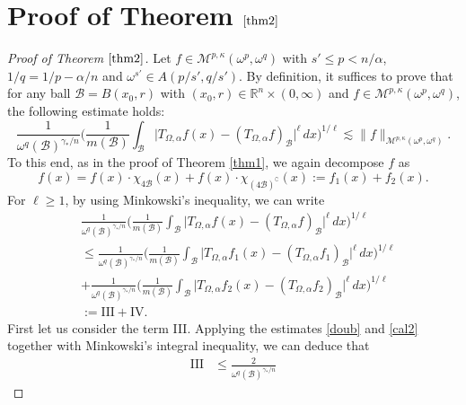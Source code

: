 \documentclass[preprint,10pt]{elsarticle}
\numberwithin{equation}{section}
\begin{document}
\section{Proof of Theorem $\ref{thm2}$}
\begin{proof}[Proof of Theorem $\ref{thm2}$]
Let $f\in\mathcal{M}^{p,\kappa}(\omega^p,\omega^q)$ with $s'\leq p<n/{\alpha}$, $1/q=1/p-{\alpha}/n$ and $\omega^{s'}\in A(p/{s'},q/{s'})$. By definition, it suffices to prove that for any ball $\mathcal{B}=B(x_0,r)$ with $(x_0,r)\in\mathbb R^n\times(0,\infty)$ and $f\in\mathcal{M}^{p,\kappa}(\omega^p,\omega^q)$, the following estimate holds:
\begin{equation}\label{mainwh}
\frac{1}{\omega^q(\mathcal{B})^{{\gamma_*}/n}}
\bigg(\frac{1}{m(\mathcal{B})}\int_{\mathcal{B}}\big|T_{\Omega,\alpha}f(x)-(T_{\Omega,\alpha}f)_{\mathcal{B}}\big|^{\ell}\,dx\bigg)^{1/{\ell}}
\lesssim\|f\|_{\mathcal{M}^{p,\kappa}(\omega^p,\omega^q)}.
\end{equation}
To this end, as in the proof of Theorem \ref{thm1}, we again decompose $f$ as
\begin{equation*}
f(x)=f(x)\cdot\chi_{4\mathcal{B}}(x)+f(x)\cdot\chi_{(4\mathcal{B})^{\complement}}(x):=f_1(x)+f_2(x).
\end{equation*}
For $\ell\geq1$, by using Minkowski's inequality, we can write
\begin{equation*}
\begin{split}
&\frac{1}{\omega^q(\mathcal{B})^{{\gamma_*}/n}}
\bigg(\frac{1}{m(\mathcal{B})}\int_{\mathcal{B}}\big|T_{\Omega,\alpha}f(x)-(T_{\Omega,\alpha}f)_{\mathcal{B}}\big|^{\ell}\,dx\bigg)^{1/{\ell}}\\
&\leq \frac{1}{\omega^q(\mathcal{B})^{{\gamma_*}/n}}
\bigg(\frac{1}{m(\mathcal{B})}\int_{\mathcal{B}}\big|T_{\Omega,\alpha}f_1(x)-(T_{\Omega,\alpha}f_1)_{\mathcal{B}}\big|^{\ell}\,dx\bigg)^{1/{\ell}}\\
&+\frac{1}{\omega^q(\mathcal{B})^{{\gamma_*}/n}}\bigg(\frac{1}{m(\mathcal{B})}
\int_{\mathcal{B}}\big|T_{\Omega,\alpha}f_2(x)-(T_{\Omega,\alpha}f_2)_{\mathcal{B}}\big|^{\ell}\,dx\bigg)^{1/{\ell}}\\
&:=\mathrm{III+IV}.
\end{split}
\end{equation*}
First let us consider the term III. Applying the estimates \eqref{doub} and \eqref{cal2} together with Minkowski's integral inequality, we can deduce that
\begin{equation*}
\begin{split}
\mathrm{III}&\leq\frac{2}{\omega^q(\mathcal{B})^{{\gamma_*}/n}}

\end{split}
\end{equation*}
\end{proof}
\end{document}
